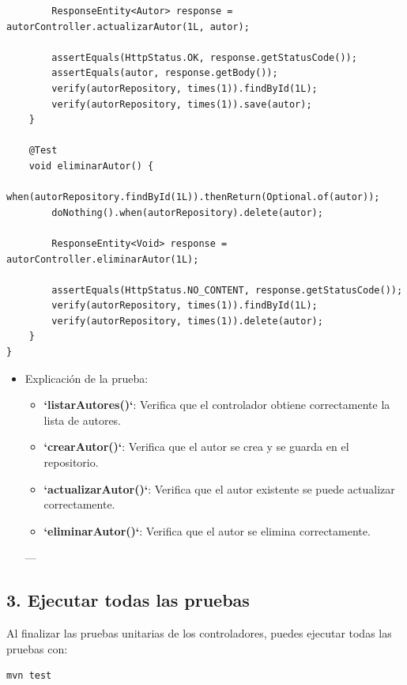\documentclass[11pt]{article}
\begin{document}
\begin{itemize}
\begin{verbatim}
        ResponseEntity<Autor> response = autorController.actualizarAutor(1L, autor);

        assertEquals(HttpStatus.OK, response.getStatusCode());
        assertEquals(autor, response.getBody());
        verify(autorRepository, times(1)).findById(1L);
        verify(autorRepository, times(1)).save(autor);
    }

    @Test
    void eliminarAutor() {
        when(autorRepository.findById(1L)).thenReturn(Optional.of(autor));
        doNothing().when(autorRepository).delete(autor);

        ResponseEntity<Void> response = autorController.eliminarAutor(1L);

        assertEquals(HttpStatus.NO_CONTENT, response.getStatusCode());
        verify(autorRepository, times(1)).findById(1L);
        verify(autorRepository, times(1)).delete(autor);
    }
}
\end{verbatim}

\begin{itemize}
\item Explicación de la prueba:
\label{sec:orgc6b890e}
\begin{itemize}
\item \textbf{\textbf{`listarAutores()`}}: Verifica que el controlador obtiene correctamente la lista de autores.
\item \textbf{\textbf{`crearAutor()`}}: Verifica que el autor se crea y se guarda en el repositorio.
\item \textbf{\textbf{`actualizarAutor()`}}: Verifica que el autor existente se puede actualizar correctamente.
\item \textbf{\textbf{`eliminarAutor()`}}: Verifica que el autor se elimina correctamente.
\end{itemize}

---
\end{itemize}
\end{itemize}

\subsection{3. Ejecutar todas las pruebas}
\label{sec:orgc91cecd}

Al finalizar las pruebas unitarias de los controladores, puedes ejecutar todas las pruebas con:

\begin{verbatim}
mvn test
\end{verbatim}
\end{document}
